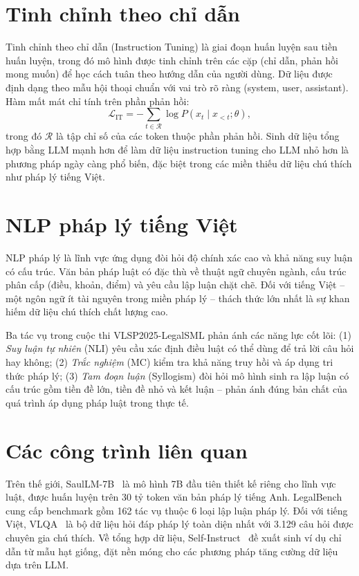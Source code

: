 \section{Tinh chỉnh theo chỉ dẫn}

Tinh chỉnh theo chỉ dẫn (Instruction Tuning) là giai đoạn huấn luyện sau tiền huấn luyện, trong đó mô hình được tinh chỉnh trên các cặp (chỉ dẫn, phản hồi mong muốn) để học cách tuân theo hướng dẫn của người dùng. Dữ liệu được định dạng theo mẫu hội thoại chuẩn với vai trò rõ ràng (system, user, assistant). Hàm mất mát chỉ tính trên phần phản hồi:
\begin{equation}
  \mathcal{L}_{\text{IT}} = -\sum_{t \in \mathcal{R}} \log P(x_t \mid x_{<t}; \theta),
\end{equation}
trong đó $\mathcal{R}$ là tập chỉ số của các token thuộc phần phản hồi. Sinh dữ liệu tổng hợp bằng LLM mạnh hơn để làm dữ liệu instruction tuning cho LLM nhỏ hơn là phương pháp ngày càng phổ biến, đặc biệt trong các miền thiếu dữ liệu chú thích như pháp lý tiếng Việt.

\section{NLP pháp lý tiếng Việt}

NLP pháp lý là lĩnh vực ứng dụng đòi hỏi độ chính xác cao và khả năng suy luận có cấu trúc. Văn bản pháp luật có đặc thù về thuật ngữ chuyên ngành, cấu trúc phân cấp (điều, khoản, điểm) và yêu cầu lập luận chặt chẽ. Đối với tiếng Việt -- một ngôn ngữ ít tài nguyên trong miền pháp lý -- thách thức lớn nhất là sự khan hiếm dữ liệu chú thích chất lượng cao.

Ba tác vụ trong cuộc thi VLSP2025-LegalSML phản ánh các năng lực cốt lõi: (1) \emph{Suy luận tự nhiên} (NLI) yêu cầu xác định điều luật có thể dùng để trả lời câu hỏi hay không; (2) \emph{Trắc nghiệm} (MC) kiểm tra khả năng truy hồi và áp dụng tri thức pháp lý; (3) \emph{Tam đoạn luận} (Syllogism) đòi hỏi mô hình sinh ra lập luận có cấu trúc gồm tiền đề lớn, tiền đề nhỏ và kết luận -- phản ánh đúng bản chất của quá trình áp dụng pháp luật trong thực tế.

\section{Các công trình liên quan}

Trên thế giới, SaulLM-7B~\cite{colombo2024saullm} là mô hình 7B đầu tiên thiết kế riêng cho lĩnh vực luật, được huấn luyện trên 30 tỷ token văn bản pháp lý tiếng Anh. LegalBench~\cite{guha2023legalbench} cung cấp benchmark gồm 162 tác vụ thuộc 6 loại lập luận pháp lý. Đối với tiếng Việt, VLQA~\cite{nguyen2025vlqa} là bộ dữ liệu hỏi đáp pháp lý toàn diện nhất với 3.129 câu hỏi được chuyên gia chú thích. Về tổng hợp dữ liệu, Self-Instruct~\cite{wang2022self} đề xuất sinh ví dụ chỉ dẫn từ mẫu hạt giống, đặt nền móng cho các phương pháp tăng cường dữ liệu dựa trên LLM.

